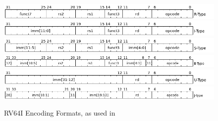 \begin{figure}
    \begin{centering}
        \includegraphics[width = \textwidth]{figures/2-RiscV/R.png}\\
        \includegraphics[width = \textwidth]{figures/2-RiscV/I.png}\\
        \includegraphics[width = \textwidth]{figures/2-RiscV/S.png}\\
        \includegraphics[width = \textwidth]{figures/2-RiscV/B.png}\\
        \includegraphics[width = \textwidth]{figures/2-RiscV/U.png}\\
        \includegraphics[width = \textwidth]{figures/2-RiscV/J.png}
        \caption[RV64I Encoding Formats]{RV64I Encoding Formats, as used in \cite[Chapter 2.3]{riscv-isa}}
        \label{fig:rv64i_formats}
    \end{centering}
\end{figure}
